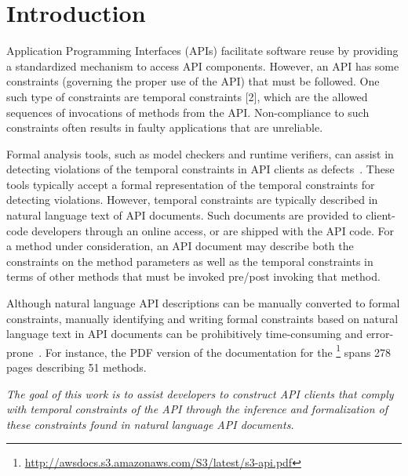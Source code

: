 \section{Introduction}
\label{sec:introduction}

Application Programming Interfaces (APIs) facilitate software reuse
by providing a standardized mechanism to access API components.
However, an API has some constraints (governing the proper use of the API) that must be followed.
One such type of constraints are temporal constraints [2], which are the allowed sequences of invocations of methods from the API.
Non-compliance to such constraints often results in faulty applications that are unreliable. %

Formal analysis tools, such as model checkers and runtime verifiers, 
can assist in detecting violations of the temporal constraints
in API clients as defects~\cite{lee2012towards}.
These tools typically accept a formal representation of the temporal constraints for detecting violations.
However, temporal constraints are typically described in natural language text of API documents.
Such documents are provided to client-code developers through an online access, or are shipped with the API code.
For a method under consideration, an API document may describe both the constraints on the method parameters
as well as the temporal constraints in terms of other methods that must be invoked pre/post invoking that method.

Although natural language API descriptions can be manually converted to formal constraints,
manually identifying and writing formal constraints based on natural language text in API documents can be prohibitively time-consuming and error-prone~\cite{wu2013inferring,RubingerWEB10}. 
For instance, the PDF version of the documentation for the \amazonAPI\footnote{{\small \url{http://awsdocs.s3.amazonaws.com/S3/latest/s3-api.pdf}}} spans 278 pages describing 51 methods.

\textit{The goal of this work is to assist developers to construct API clients that comply with temporal constraints of the API through the inference and formalization of these constraints found in natural language API documents.}

